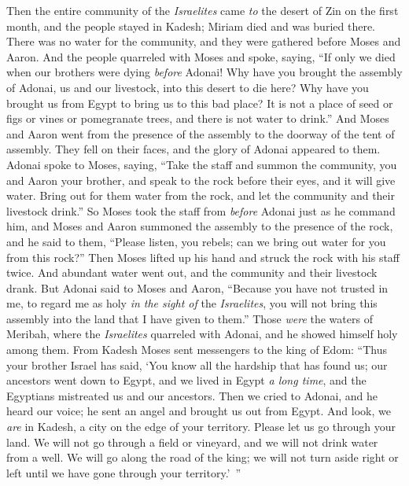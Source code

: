 \begin{biblechapter} %
 Then the entire community of the \textit{Israelites} came \textit{to} the desert of Zin on the first month, and the people stayed in Kadesh; Miriam died and was buried there.
\verse There was no water for the community, and they were gathered before Moses and Aaron.
\verse And the people quarreled with Moses and spoke, saying, “If only we died when our brothers were dying \textit{before} Adonai!
\verse Why have you brought the assembly of Adonai, us and our livestock, into this desert to die here?
\verse Why have you brought us from Egypt to bring us to this bad place? It is not a place of seed or figs or vines or pomegranate trees, and there is not water to drink.”
\verse And Moses and Aaron went from the presence of the assembly to the doorway of the tent of assembly. They fell on their faces, and the glory of Adonai appeared to them.
\verse Adonai spoke to Moses, saying,
\verse “Take the staff and summon the community, you and Aaron your brother, and speak to the rock before their eyes, and it will give water. Bring out for them water from the rock, and let the community and their livestock drink.”
\verse So Moses took the staff from \textit{before} Adonai just as he command him,
\verse and Moses and Aaron summoned the assembly to the presence of the rock, and he said to them, “Please listen, you rebels; can we bring out water for you from this rock?”
\verse Then Moses lifted up his hand and struck the rock with his staff twice. And abundant water went out, and the community and their livestock drank.
\verse But Adonai said to Moses and Aaron, “Because you have not trusted in me, to regard me as holy \textit{in the sight of} the \textit{Israelites}, you will not bring this assembly into the land that I have given to them.”
\verse Those \textit{were} the waters of Meribah, where the \textit{Israelites} quarreled with Adonai, and he showed himself holy among them.
\verse From Kadesh Moses sent messengers to the king of Edom: “Thus your brother Israel has said, ‘You know all the hardship that has found us;
\verse our ancestors went down to Egypt, and we lived in Egypt \textit{a long time}, and the Egyptians mistreated us and our ancestors.
\verse Then we cried to Adonai, and he heard our voice; he sent an angel and brought us out from Egypt. And look, we \textit{are} in Kadesh, a city on the edge of your territory.
\verse Please let us go through your land. We will not go through a field or vineyard, and we will not drink water from a well. We will go along the road of the king; we will not turn aside right or left until we have gone through your territory.’ ”

\end{biblechapter}
